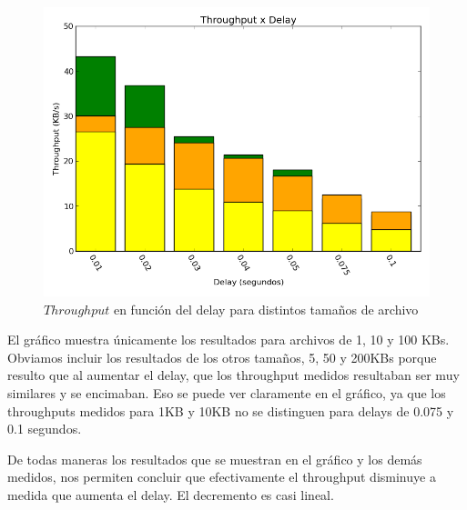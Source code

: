 \begin{figure}[H]
	\begin{center}
		  \includegraphics[scale=0.5]{../graficos/test2.png}
		  \caption{$Throughput$ en función del delay para distintos tamaños de archivo}
		  \label{fig:contra1}
	\end{center}
\end{figure}

El gráfico muestra únicamente los resultados para archivos de 1, 10 y 100 KBs. Obviamos incluir los resultados de los otros tamaños, 5, 50 y 200KBs porque resulto que al aumentar el delay, que los throughput medidos resultaban ser muy similares y se encimaban. Eso se puede ver claramente en el gráfico, ya que los throughputs medidos para 1KB y 10KB no se distinguen para delays de 0.075 y 0.1 segundos.

De todas maneras los resultados que se muestran en el gráfico y los demás medidos, nos permiten concluir que efectivamente el throughput disminuye a medida que aumenta el delay. El decremento es casi lineal.
